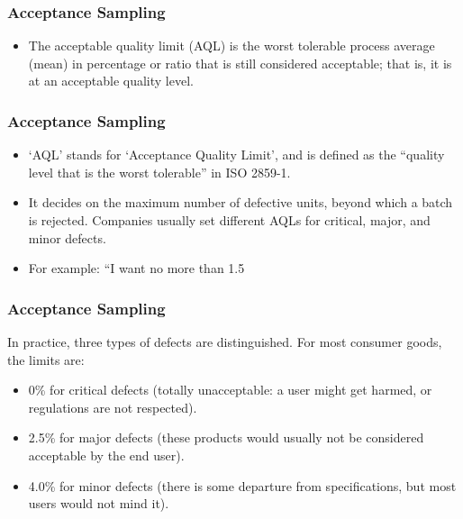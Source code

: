 

\begin{frame}
\frametitle{Acceptance Sampling}
\large

\begin{itemize}
\item The acceptable quality limit (AQL) is the worst tolerable process average (mean) in percentage or ratio that is still considered acceptable; that is, it is at an acceptable quality level. 
\end{itemize}

\end{frame}

\begin{frame}
\frametitle{Acceptance Sampling}
\large
\begin{itemize}
\item 
‘AQL’ stands for ‘Acceptance Quality Limit’, and is defined as the “quality level that is the worst tolerable” in ISO 2859-1. 
\item It decides on the maximum number of defective units, beyond which a batch is rejected. Companies usually set different AQLs for critical, major, and minor defects.
\item
For example: “I want no more than 1.5%
\end{itemize}
\end{frame}

\begin{frame}
\frametitle{Acceptance Sampling}
\large
In practice, three types of defects are distinguished. For most consumer goods, the limits are:

\begin{itemize}
\item
0\% for critical defects (totally unacceptable: a user might get harmed, or regulations are not respected).
\item 2.5\% for major defects (these products would usually not be considered acceptable by the end user).
\item
4.0\% for minor defects (there is some departure from specifications, but most users would not mind it).
\end{itemize}

\end{frame}

